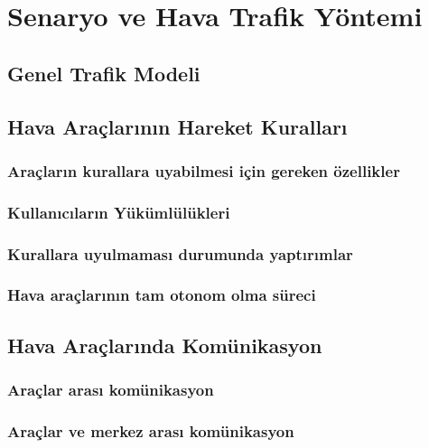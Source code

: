 \section{Senaryo ve Hava Trafik Yöntemi}


\subsection{Genel Trafik Modeli}

\subsection{Hava Araçlarının Hareket Kuralları}
\subsubsection{Araçların kurallara uyabilmesi için gereken özellikler}
\subsubsection{Kullanıcıların Yükümlülükleri}
\subsubsection{Kurallara uyulmaması durumunda yaptırımlar}
\subsubsection{Hava araçlarının tam otonom olma süreci}

\subsection{Hava Araçlarında Komünikasyon}

\subsubsection{Araçlar arası komünikasyon}
\subsubsection{Araçlar ve merkez arası komünikasyon}

